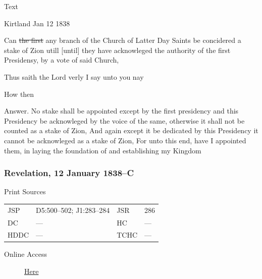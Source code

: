 				\begin{description}
					\item[Text]
				\end{description}
				
					\begin{tightcenter}
					Kirtland Jan 12 1838
					\end{tightcenter}
					
					Can \sout{the first} any branch of the Church of Latter Day Saints be concidered a stake of Zion utill [until] they have acknowleged the authority of the first Presidensy, by a vote of said Church,
					
					Thus saith the Lord verly I say unto you nay
					
					How then
					
					Answer. No stake shall be appointed except by the first presidency and this Presidency be acknowleged by the voice of the same, otherwise it shall not be counted as a stake of Zion, And again except it be dedicated by this Presidency it cannot be acknowleged as a stake of Zion, For unto this end, have I appointed them, in laying the foundation of and establishing my Kingdom
					
		\subsubsection{Revelation, 12 January 1838--C}
			\label{EMS-1838-JS-12-JAN-1838-C}
			
			\begin{description}
					\item[Print Sources]
				\end{description}

					\begin{tabular}{p{0.5in}p{1in}p{0.5in}p{1in}}
					JSP	 	& D5:500--502; J1:283--284		& JSR 		& 286 \\
					DC	 	& ---		& HC 		& --- \\
					HDDC 	& ---		& TCHC 		& --- \\
					\end{tabular}
				
				\begin{description}
					\item[Online Access] \href{https://www.josephsmithpapers.org/paper-summary/revelation-12-january-1838-c/1}{Here}
				\end{description}
				
